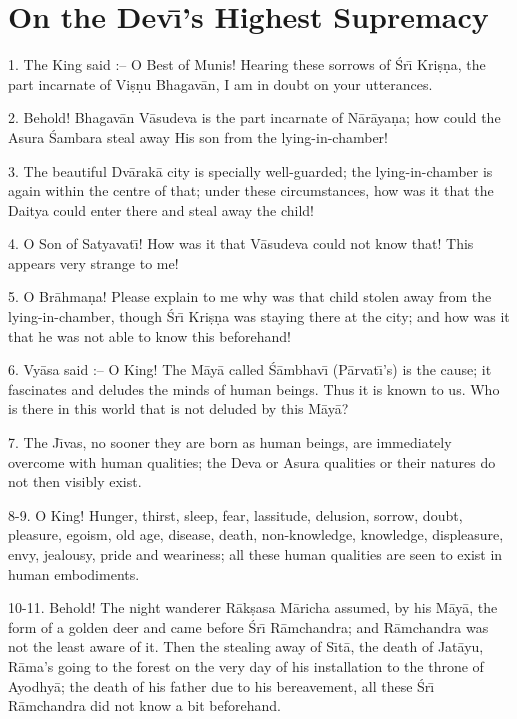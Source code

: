 \chapter{On the Dev\={\i}'s Highest Supremacy}

1. The King said :-- O Best of Munis! Hearing these sorrows of \'Sr\={\i} Kri\d{s}\d{n}a, the part incarnate of Vi\d{s}\d{n}u Bhagav\=an, I am in doubt on your utterances.

2. Behold! Bhagav\=an V\=asudeva is the part incarnate of N\=ar\=aya\d{n}a; how could the Asura \'Sambara steal away His son from the lying-in-chamber!

3. The beautiful Dv\=arak\=a city is specially well-guarded; the lying-in-chamber is again within the centre of that; under these circumstances, how was it that the Daitya could enter there and steal away the child!

4. O Son of Satyavat\={\i}! How was it that V\=asudeva could not know that! This appears very strange to me!

5. O Br\=ahma\d{n}a! Please explain to me why was that child stolen away from the lying-in-chamber, though \'Sr\={\i} Kri\d{s}\d{n}a was staying there at the city; and how was it that he was not able to know this beforehand!

6. Vy\=asa said :-- O King! The M\=ay\=a called \'S\=ambhav\={\i} (P\=arvat\={\i}'s) is the cause; it fascinates and deludes the minds of human beings. Thus it is known to us. Who is there in this world that is not deluded by this M\=ay\=a?

7. The J\={\i}vas, no sooner they are born as human beings, are immediately overcome with human qualities; the Deva or Asura qualities or their natures do not then visibly exist.

8-9. O King! Hunger, thirst, sleep, fear, lassitude, delusion, sorrow, doubt, pleasure, egoism, old age, disease, death, non-knowledge, knowledge, displeasure, envy, jealousy, pride and weariness; all these human qualities are seen to exist in human embodiments.

10-11. Behold! The night wanderer R\=ak\d{s}asa M\=aricha assumed, by his M\=ay\=a, the form of a golden deer and came before \'Sr\={\i} R\=amchandra; and R\=amchandra was not the least aware of it. Then the stealing away of S\={\i}t\=a, the death of Jat\=ayu, R\=ama's going to the forest on the very day of his installation to the throne of Ayodhy\=a; the death of his father due to his bereavement, all these \'Sr\={\i} R\=amchandra did not know a bit beforehand.


